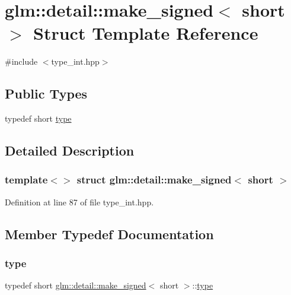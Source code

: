 \hypertarget{structglm_1_1detail_1_1make__signed_3_01short_01_4}{}\section{glm\+::detail\+::make\+\_\+signed$<$ short $>$ Struct Template Reference}
\label{structglm_1_1detail_1_1make__signed_3_01short_01_4}


{\ttfamily \#include $<$type\+\_\+int.\+hpp$>$}

\subsection*{Public Types}
\begin{DoxyCompactItemize}
\item 
typedef short \mbox{\hyperlink{structglm_1_1detail_1_1make__signed_3_01short_01_4_a9488d8ffbd34998675456fa6d1143989}{type}}
\end{DoxyCompactItemize}


\subsection{Detailed Description}
\subsubsection*{template$<$$>$\newline
struct glm\+::detail\+::make\+\_\+signed$<$ short $>$}



Definition at line 87 of file type\+\_\+int.\+hpp.



\subsection{Member Typedef Documentation}
\mbox{\label{structglm_1_1detail_1_1make__signed_3_01short_01_4_a9488d8ffbd34998675456fa6d1143989}} 
\subsubsection{\texorpdfstring{type}{type}}
{\footnotesize\ttfamily typedef short \mbox{\hyperlink{structglm_1_1detail_1_1make__signed}{glm\+::detail\+::make\+\_\+signed}}$<$ short $>$\+::\mbox{\hyperlink{structglm_1_1detail_1_1make__signed_3_01short_01_4_a9488d8ffbd34998675456fa6d1143989}{type}}}



